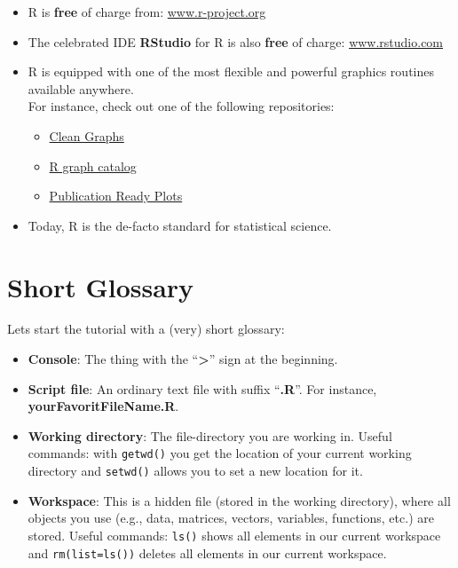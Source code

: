 \documentclass[
]{book}
\providecommand{\tightlist}{%
  \setlength{\itemsep}{0pt}\setlength{\parskip}{0pt}}
\begin{document}
\begin{itemize}
\tightlist
\item
  R is \textbf{free} of charge from: \href{https://www.r-project.org/}{www.r-project.org}
\item
  The celebrated IDE \textbf{RStudio} for R is also \textbf{free} of charge: \href{http://www.rstudio.com/}{www.rstudio.com}
\item
  R is equipped with one of the most flexible and powerful graphics routines available anywhere.\\
  For instance, check out one of the following repositories:

  \begin{itemize}
  \tightlist
  \item
    \href{http://shinyapps.org/apps/RGraphCompendium/index.php}{Clean Graphs}
  \item
    \href{http://shiny.stat.ubc.ca/r-graph-catalog/}{R graph catalog}
  \item
    \href{http://www.sthda.com/english/rpkgs/ggpubr/}{Publication Ready Plots}
  \end{itemize}
\item
  Today, R is the de-facto standard for statistical science.
\end{itemize}

\hypertarget{short-glossary}{%
\section{Short Glossary}\label{short-glossary}}

Lets start the tutorial with a (very) short glossary:

\begin{itemize}
\tightlist
\item
  \textbf{Console}: The thing with the ``\textbf{\textgreater{}}'' sign at the beginning.
\item
  \textbf{Script file}: An ordinary text file with suffix ``\textbf{.R}''. For instance, \textbf{yourFavoritFileName.R}.
\item
  \textbf{Working directory}: The file-directory you are working in. Useful commands: with \texttt{getwd()} you get the location of your current working directory and \texttt{setwd()} allows you to set a new location for it.
\item
  \textbf{Workspace}: This is a hidden file (stored in the working directory), where all objects you use (e.g., data, matrices, vectors, variables, functions, etc.) are stored. Useful commands: \texttt{ls()} shows all elements in our current workspace and \texttt{rm(list=ls())} deletes all elements in our current workspace.
\end{itemize}
\end{document}
